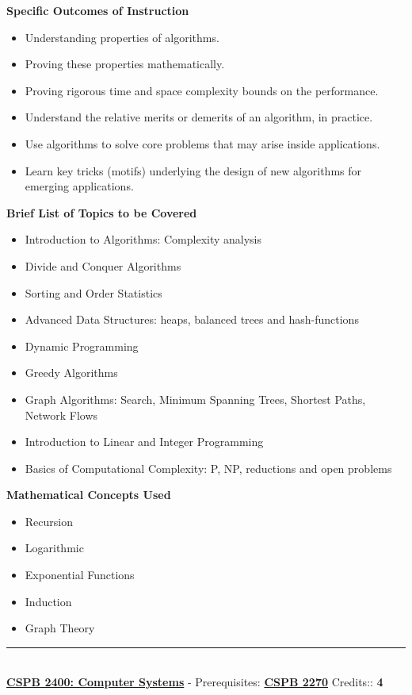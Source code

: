 \documentclass{article}
\newcommand{\horizontalline}{\noindent \rule{\textwidth}{0.5pt} \\}
\begin{document}
\noindent \textbf{Specific Outcomes of Instruction}
\begin{itemize}
    \item Understanding properties of algorithms.
    \item Proving these properties mathematically.
    \item Proving rigorous time and space complexity bounds on the performance.
    \item Understand the relative merits or demerits of an algorithm, in practice.
    \item Use algorithms to solve core problems that may arise inside applications.
    \item Learn key tricks (motifs) underlying the design of new algorithms for emerging applications.
\end{itemize}

\noindent \textbf{Brief List of Topics to be Covered}
\begin{itemize}
    \item Introduction to Algorithms: Complexity analysis
    \item Divide and Conquer Algorithms
    \item Sorting and Order Statistics
    \item Advanced Data Structures: heaps, balanced trees and hash-functions
    \item Dynamic Programming
    \item Greedy Algorithms
    \item Graph Algorithms: Search, Minimum Spanning Trees, Shortest Paths, Network Flows
    \item Introduction to Linear and Integer Programming
    \item Basics of Computational Complexity: P, NP, reductions and open problems
\end{itemize}

\noindent \textbf{Mathematical Concepts Used}
\begin{itemize}
    \item Recursion
    \item Logarithmic
    \item Exponential Functions
    \item Induction
    \item Graph Theory
\end{itemize}
\horizontalline
\noindent \href{https://www.colorado.edu/program/cspb/cspb-2400-computer-systems}{\textbf{CSPB 2400: Computer Systems}} - Prerequisites: \href{https://www.colorado.edu/program/cspb/cspb-2270-computer-science-2-data-structures}{\textbf{CSPB 2270}} Credits:: \textbf{4} \\
\end{document}
